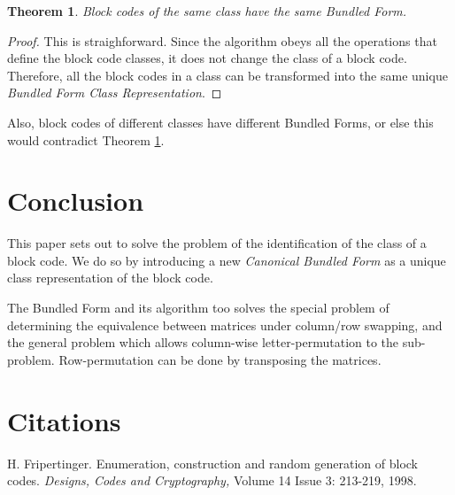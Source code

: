 \documentclass[12pt]{article}  %
\newtheorem{theorem}{Theorem}
\begin{document}
\begin{theorem}\label{thm:same}
Block codes of the same class have the same Bundled Form.
\end{theorem}
\begin{proof}
This is straighforward. Since the algorithm obeys all the operations that define the block code classes, it does not change the class of a block code. Therefore, all the block codes in a class can be transformed into the same unique \emph{Bundled Form Class Representation}.
\end{proof}

Also, block codes of different classes have different Bundled Forms, or else this would contradict Theorem \ref{thm:same}.



\section{Conclusion}
This paper sets out to solve the problem of the identification of the class of a block code. We do so by introducing a new \emph{Canonical Bundled Form} as a unique class representation of the block code.


The Bundled Form and its algorithm too solves the special problem of determining the equivalence between matrices under column/row swapping, and the general problem which allows column-wise letter-permutation to the sub-problem. Row-permutation can be done by transposing the matrices.




\section{Citations}


H. Fripertinger. Enumeration, construction and random generation of block codes. \emph{Designs, Codes and Cryptography,} Volume 14 Issue 3: 213-219, 1998.
\end{document}
